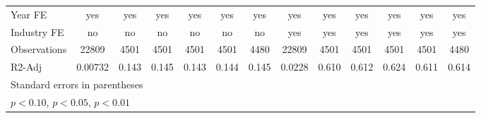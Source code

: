 {\begin{tabular}{l*{12}{c}}
\hline
Year FE             &         yes         &         yes         &         yes         &         yes         &         yes         &         yes         &         yes         &         yes         &         yes         &         yes         &         yes         &         yes         \\
Industry FE         &          no         &          no         &          no         &          no         &          no         &          no         &         yes         &         yes         &         yes         &         yes         &         yes         &         yes         \\
Observations        &       22809         &        4501         &        4501         &        4501         &        4501         &        4480         &       22809         &        4501         &        4501         &        4501         &        4501         &        4480         \\
R2-Adj              &     0.00732         &       0.143         &       0.145         &       0.143         &       0.144         &       0.145         &      0.0228         &       0.610         &       0.612         &       0.624         &       0.611         &       0.614         \\
\hline\hline
\multicolumn{13}{l}{\footnotesize Standard errors in parentheses}\\
\multicolumn{13}{l}{\footnotesize \sym{*} \(p<0.10\), \sym{**} \(p<0.05\), \sym{***} \(p<0.01\)}\\
\end{tabular}
}
